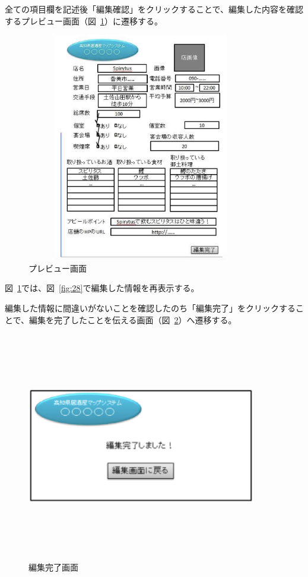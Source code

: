 全ての項目欄を記述後「編集確認」をクリックすることで、編集した内容を確認するプレビュー画面（図~\ref{fig:30}）に遷移する。



\begin {figure}[!htbp]
    \begin{center}
    \includegraphics [height=10cm, width=10cm]{30.eps}
    \caption {プレビュー画面}
    \label {fig:30}
    \end{center}
\end {figure}


\clearpage
図~\ref{fig:30}では、図~\ref{fig:28}で編集した情報を再表示する。



編集した情報に間違いがないことを確認したのち「編集完了」をクリックすることで、編集を完了したことを伝える画面（図~\ref{fig:31}）へ遷移する。



\begin {figure}[!htbp]
    \begin{center}
    \includegraphics [height=10cm, width=10cm]{31.eps}
    \caption {編集完了画面}
    \label {fig:31}
    \end{center}
\end {figure}



